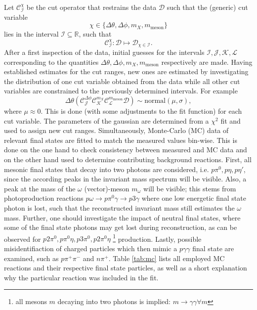 Let $\mathcal{C}^\chi_{\mathcal{I}}$ be the cut operator that restrains the data $\mathcal{D}$ such that the (generic) cut variable $$\chi\in\{\Delta\theta,\Delta\phi,m_X,m_\text{meson}\}$$ lies in the interval $\mathcal{I}\subseteq\mathbb{R}$, such that 
\begin{equation}
	\mathcal{C}_{\mathcal{I}}^\chi:\mathcal{D}\mapsto\mathcal{D}_{\chi\in\mathcal{I}} .
\end{equation}
	 After a first inspection of the data, initial guesses for the intervals $\mathcal{I},\mathcal{J},\mathcal{K},\mathcal{L}$ corresponding to the quantities $\Delta\theta,\Delta\phi,m_X,m_\text{meson}$ respectively are made.
	Having established estimates for the cut ranges, new ones are estimated by investigating the distribution of one cut variable obtained from the data while all other cut variables are constrained to the previously determined intervals. For example 
	$$\Delta\theta\left(\mathcal{C}_\mathcal{J}^{\Delta\phi}\mathcal{C}_\mathcal{K}^{m_X}\mathcal{C}_\mathcal{L}^{m_\text{meson}}\mathcal{D}\right)\sim \text{normal}(\mu,\sigma),$$
	where $\mu\approx0$. This is done (with some adjustments to the fit function) for each cut variable. The parameters of the gaussian are determined from a $\chi^2$ fit and used to assign new cut ranges. Simultaneously, Monte-Carlo (MC) data of relevant final states are fitted to match the measured values bin-wise. This is done on the one hand to check consistency between measured and MC data and on the other hand used to determine contributing background reactions. First, all mesonic final states that decay into two photons are considered, i.e. $p\pi^0,p\eta,p\eta'$, since the according peaks in the invariant mass spectrum will be visible. Also, a peak at the mass of the $\omega$ (vector)-meson $m_\omega$ will be visible; this stems from photoproduction reactions $p\omega\to p\pi^0\gamma\to p3\gamma$ where one low energetic final state photon is lost, such that the reconstructed invariant mass still estimates the $\omega$ mass. Further, one should investigate the impact of neutral final states, where some of the final state photons may get lost during reconstruction, as can be observed for $p2\pi^0,p\pi^0\eta,p3\pi^0,p2\pi^0\eta$ \footnote{all mesons $m$ decaying into two photons is implied: $m\to\gamma\gamma \forall m$} production. Lastly, possible misidentifiaction of charged particles which then mimic a $p\gamma\gamma$ final state are examined, such as $p\pi^+\pi^-$ and $n\pi^+$. Table \ref{tab:mc} lists all employed MC reactions and their respective final state particles, as well as a short explanation why the particular reaction was included in the fit.
	
